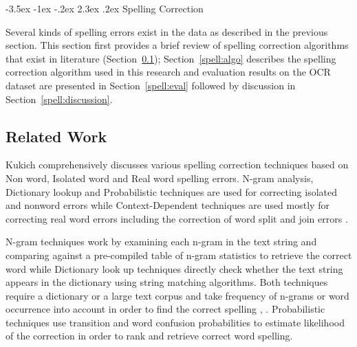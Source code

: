 \documentclass[12pt]{article}
\makeatletter
\renewcommand\section{\@startsection{section}{1}{\z@}%
                                  {-3.5ex \@plus -1ex \@minus -.2ex}%
                                  {2.3ex \@plus.2ex}%
                                  {\normalfont\bfseries}}
\makeatother
\begin{document}

 

\section{Spelling Correction}

Several kinds of spelling errors exist in the data as described in the previous section. This section first provides a brief review of spelling correction algorithms that exist in literature (Section~\ref{spell:rw}); Section~\ref{spell:algo} describes the spelling correction algorithm used in this research and evaluation results on the OCR dataset are presented in Section~\ref{spell:eval} followed by discussion in Section~\ref{spell:discussion}.



\subsection{Related Work}
\label{spell:rw}

Kukich\cite{kukich1992techniques} comprehensively discusses various spelling correction techniques based on Non word, Isolated word and Real word spelling errors. N-gram analysis, Dictionary lookup and Probabilistic techniques are used for correcting isolated and nonword errors while Context-Dependent techniques are used mostly for correcting real word errors including the correction of word split and join errors \cite{elmi1998spelling}.

 N-gram techniques work by examining each n-gram in the text string and comparing against a pre-compiled table of n-gram statistics to retrieve the correct word while Dictionary look up techniques directly check whether the text string appears in the dictionary using string matching algorithms. Both techniques require a dictionary or a large text corpus and take frequency of n-grams or word occurrence into account in order to find the correct spelling \cite{strohmaier2003lexical}, \cite{ringlstetter2007text}.
 Probabilistic techniques use transition and word confusion probabilities to estimate likelihood of the correction in order to rank and retrieve correct word spelling.
\end{document}
